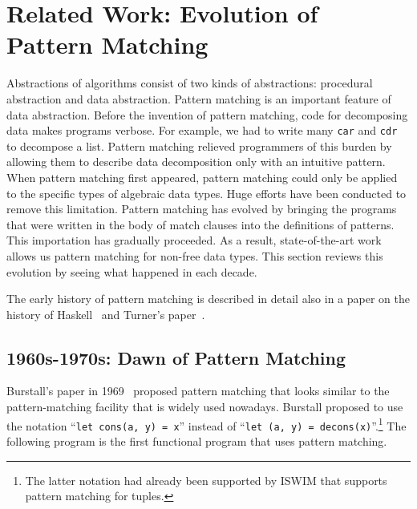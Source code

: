 \documentclass{article}
\begin{document}
\section{Related Work: Evolution of Pattern Matching}\label{related}


Abstractions of algorithms consist of two kinds of abstractions: procedural abstraction and data abstraction.
Pattern matching is an important feature of data abstraction.
Before the invention of pattern matching, code for decomposing data makes programs verbose.
For example, we had to write many \texttt{car} and \texttt{cdr} to decompose a list.
Pattern matching relieved programmers of this burden by allowing them to describe data decomposition only with an intuitive pattern.
When pattern matching first appeared, pattern matching could only be applied to the specific types of algebraic data types.
Huge efforts have been conducted to remove this limitation.
Pattern matching has evolved by bringing the programs that were written in the body of match clauses into the definitions of patterns.
This importation has gradually proceeded.
As a result, state-of-the-art work allows us pattern matching for non-free data types.
This section reviews this evolution by seeing what happened in each decade.

The early history of pattern matching is described in detail also in a paper on the history of Haskell~\cite{Hudak07ahistory} and Turner's paper~\cite{turner2012some}.

\subsection{1960s-1970s: Dawn of Pattern Matching}


Burstall's paper in 1969~\cite{burstall1969proving} proposed pattern matching that looks similar to the pattern-matching facility that is widely used nowadays.
Burstall proposed to use the notation ``\texttt{let cons(a, y) = x}'' instead of ``\texttt{let (a, y) = decons(x)}''.\footnote{The latter notation had already been supported by ISWIM that supports pattern matching for tuples.}
The following program is the first functional program that uses pattern matching.
\end{document}
